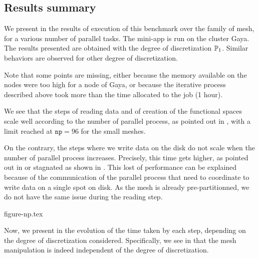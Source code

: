
\subsection{Results summary}



We present in  the results of execution of this benchmark over the family of mesh, for a various number of parallel tasks.
The mini-app is run on the cluster Gaya.
The results presented are obtained with the degree of discretization $\mathbb{P}_1$.
Similar behaviors are observed for other degree of discretization.

Note that some points are missing, either because the memory available on the nodes were too high for a node of Gaya, or because the iterative process described above took more than the time allocated to the job (1 hour).

We see that the steps of reading data and of creation of the functional spaces scale well according to the number of parallel process, as pointed out in , with a limit reached at $\texttt{np}=96$ for the small meshes.

On the contrary, the steps where we write data on the disk do not scale when the number of parallel process increases.
Precisely, this time gets higher, as pointed out in  or stagnated as shown in .
This lost of performance can be explained because of the communication of the parallel process that need to coordinate to write data on a single spot on disk.
As the mesh is already pre-partitionned, we do not have the same issue during the reading step.

{figure-np.tex}


\vspace{\baselineskip}

Now, we present in  the evolution of the time taken by each step, depending on the degree of discretization considered.
Specifically, we see in  that the mesh manipulation is indeed independent of the degree of discretization.

